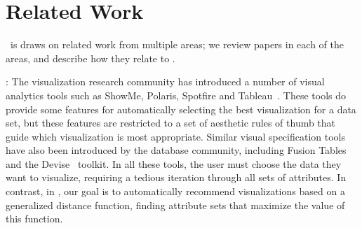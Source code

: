 

\section{Related Work}
\label{sec:related_work}
\SeeDB\ is draws on related work from multiple areas;
we review papers in each of the areas, and describe how they relate to
\SeeDB. 



:
The visualization 
research community has introduced a number of
visual analytics tools such as ShowMe, Polaris, Spotfire and 
Tableau~\cite{DBLP:journals/cacm/StolteTH08, DBLP:journals/tvcg/MackinlayHS07, Ahlberg:1996:SIE:245882.245893}.
These tools do provide some features for automatically selecting
the best visualization for a data set, 
but these features are restricted to a set of aesthetic rules of thumb that
guide which visualization is most appropriate.
Similar visual specification tools 
have also been introduced by the
database community, including Fusion
Tables~\cite{DBLP:conf/sigmod/GonzalezHJLMSSG10} and the
Devise~\cite{DBLP:conf/sigmod/LivnyRBCDLMW97} toolkit. 
In all these tools, the user must choose the data they want to visualize, requiring
a tedious iteration through all sets of attributes.
In contrast, in \SeeDB, our goal is to automatically recommend visualizations
based on a generalized distance function, finding
attribute sets that maximize the value of this function.

